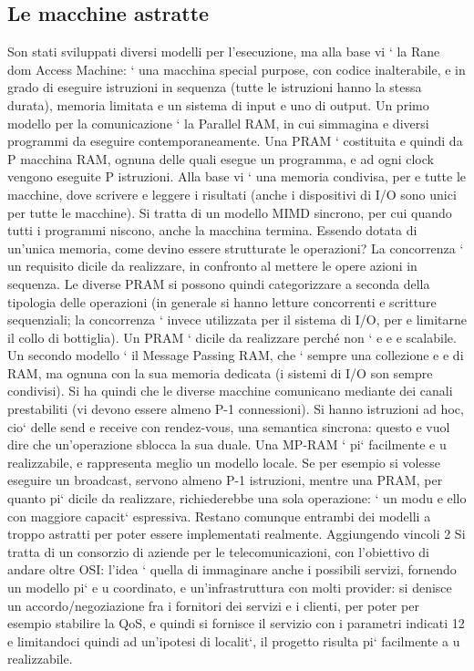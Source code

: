 \documentclass[a4paper,12pt]{article}
\begin{document}
\subsection{Le macchine astratte}
Son stati sviluppati diversi modelli per l'esecuzione, ma alla base vi ` la Rane
dom Access Machine: ` una macchina special purpose, con codice inalterabile,
e
in grado di eseguire istruzioni in sequenza (tutte le istruzioni hanno la stessa
durata), memoria limitata e un sistema di input e uno di output.
Un primo modello per la comunicazione ` la Parallel RAM, in cui simmagina
e
diversi programmi da eseguire contemporaneamente. Una PRAM ` costituita
e
quindi da P macchina RAM, ognuna delle quali esegue un programma, e ad ogni
clock vengono eseguite P istruzioni. Alla base vi ` una memoria condivisa, per
e
tutte le macchine, dove scrivere e leggere i risultati (anche i dispositivi di I/O
sono unici per tutte le macchine). Si tratta di un modello MIMD sincrono, per
cui quando tutti i programmi niscono, anche la macchina termina. Essendo
dotata di un'unica memoria, come devino essere strutturate le operazioni? La
concorrenza ` un requisito dicile da realizzare, in confronto al mettere le opere
azioni in sequenza. Le diverse PRAM si possono quindi categorizzare a seconda
della tipologia delle operazioni (in generale si hanno letture concorrenti e scritture sequenziali; la concorrenza `
invece utilizzata per il sistema di I/O, per
e
limitarne il collo di bottiglia). Un PRAM ` dicile da realizzare perché non `
e
e
e
scalabile.
Un secondo modello ` il Message Passing RAM, che ` sempre una collezione
e
e
di RAM, ma ognuna con la sua memoria dedicata (i sistemi di I/O son sempre
condivisi). Si ha quindi che le diverse macchine comunicano mediante dei canali
prestabiliti (vi devono essere almeno P-1 connessioni). Si hanno istruzioni ad
hoc, cio` delle send e receive con rendez-vous, una semantica sincrona: questo
e
vuol dire che un'operazione sblocca la sua duale. Una MP-RAM ` pi` facilmente
e u
realizzabile, e rappresenta meglio un modello locale. Se per esempio si volesse
eseguire un broadcast, servono almeno P-1 istruzioni, mentre una PRAM, per
quanto pi` dicile da realizzare, richiederebbe una sola operazione: ` un modu
e
ello con maggiore capacit` espressiva. Restano comunque entrambi dei modelli
a
troppo astratti per poter essere implementati realmente. Aggiungendo vincoli
2 Si tratta di un consorzio di aziende per le telecomunicazioni, con l'obiettivo di andare
oltre OSI: l'idea ` quella di immaginare anche i possibili servizi, fornendo un modello pi`
e
u
coordinato, e un'infrastruttura con molti provider: si denisce un accordo/negoziazione fra i
fornitori dei servizi e i clienti, per poter per esempio stabilire la QoS, e quindi si fornisce il
servizio con i parametri indicati
12
e limitandoci quindi ad un'ipotesi di localit`, il progetto risulta pi` facilmente
a
u
realizzabile.
\end{document}

